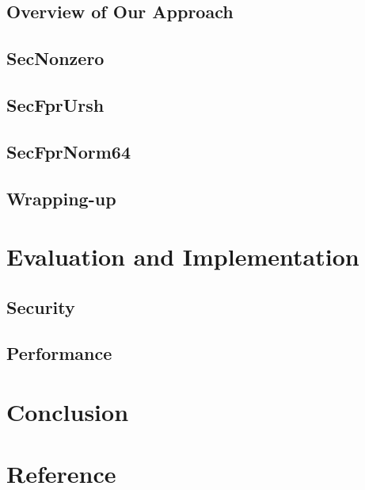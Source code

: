 \subsection{Overview of Our Approach}


\subsection{SecNonzero}


\subsection{SecFprUrsh}


\subsection{SecFprNorm64}


\subsection*{Wrapping-up}

%
%



\section{Evaluation and Implementation}

\subsection{Security}


\subsection{Performance}




\section{Conclusion}




\section*{Reference}

